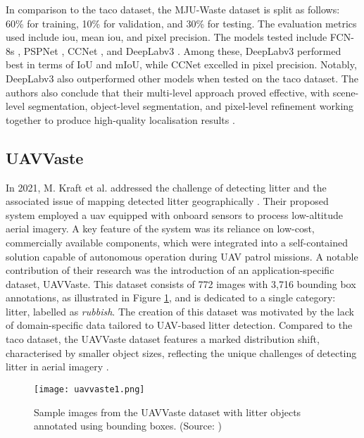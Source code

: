 In comparison to the \gls{taco} dataset, the MJU-Waste dataset is split as follows: 60\% for training, 10\% for validation, and 30\% for testing. The evaluation metrics used include \gls{iou}, mean \gls{iou}, and pixel precision. The models tested include FCN-8s \cite{fcn}, PSPNet \cite{pspnet}, CCNet \cite{ccnet}, and DeepLabv3 \cite{deeplabv3}. Among these, DeepLabv3 performed best in terms of IoU and mIoU, while CCNet excelled in pixel precision. Notably, DeepLabv3 also outperformed other models when tested on the \gls{taco} dataset.
The authors also conclude that their multi-level approach proved effective, with scene-level segmentation, object-level segmentation, and pixel-level refinement working together to produce high-quality localisation results \cite{mju_waste}.

\subsection{UAVVaste}
\label{subsec:3_uavvaste}

In 2021, M. Kraft et al. addressed the challenge of detecting litter and the associated issue of mapping detected litter geographically \cite{uavvaste}. Their proposed system employed a \gls{uav} equipped with onboard sensors to process low-altitude aerial imagery. A key feature of the system was its reliance on low-cost, commercially available components, which were integrated into a self-contained solution capable of autonomous operation during UAV patrol missions.
A notable contribution of their research was the introduction of an application-specific dataset, UAVVaste. This dataset consists of 772 images with 3,716 bounding box annotations, as illustrated in Figure \ref{fig:uavvaste1}, and is dedicated to a single category: litter, labelled as \textit{rubbish}. The creation of this dataset was motivated by the lack of domain-specific data tailored to UAV-based litter detection. Compared to the \gls{taco} dataset, the UAVVaste dataset features a marked distribution shift, characterised by smaller object sizes, reflecting the unique challenges of detecting litter in aerial imagery \cite{uavvaste}.

\begin{figure}[!htbp]
    \centering
    \texttt{[image: uavvaste1.png]}
    \caption{Sample images from the UAVVaste dataset with litter objects annotated using bounding boxes. (Source: \cite{uavvaste})}
    \label{fig:uavvaste1}
\end{figure}

